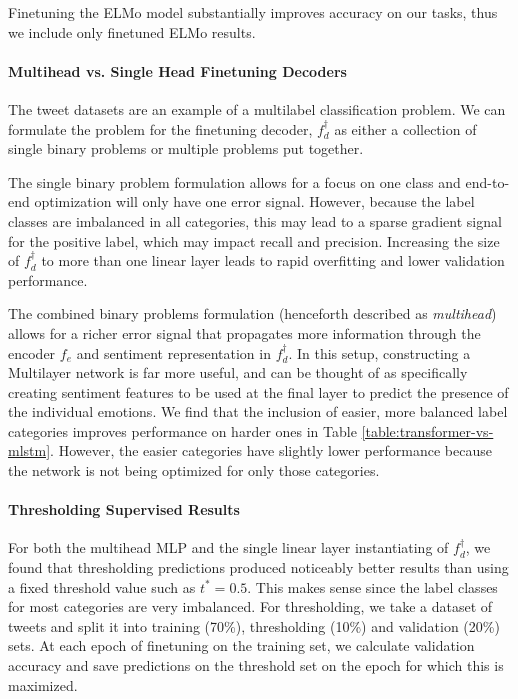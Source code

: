 \documentclass[letterpaper]{article} %
\begin{document}
Finetuning the ELMo model substantially improves accuracy on our tasks, thus we include only finetuned ELMo results. 

\paragraph{Multihead vs. Single Head Finetuning Decoders}
The tweet datasets are an example of a multilabel classification problem. We can formulate the problem for the finetuning decoder, $f_d^{\dagger}$ as either a collection of single binary problems or multiple problems put together. 

The single binary problem formulation allows for a focus on one class and end-to-end optimization will only have one error signal. However, because the label classes are imbalanced in all categories, this may lead to a sparse gradient signal for the positive label, which may impact recall and precision. Increasing the size of $f_d^{\dagger}$ to more than one linear layer leads to rapid overfitting and lower validation performance.

The combined binary problems formulation (henceforth described as \textit{multihead}) allows for a richer error signal that propagates more information through the encoder $f_e$ and sentiment representation in $f^{\dagger}_d$. In this setup, constructing a Multilayer network is far more useful, and can be thought of as specifically creating sentiment features to be used at the final layer to predict the presence of the individual emotions. We find that the inclusion of easier, more balanced label categories improves performance on harder ones in Table \ref{table:transformer-vs-mlstm}. However, the easier categories have slightly lower performance because the network is not being optimized for only those categories. 

\paragraph{Thresholding Supervised Results}
For both the multihead MLP and the single linear layer instantiating of $f_d^{\dagger}$, we found that thresholding predictions produced noticeably better results than using a fixed threshold value such as $t^* = 0.5$. This makes sense since the label classes for most categories are very imbalanced. For thresholding, we take a dataset of tweets and split it into training (70\%), thresholding (10\%) and validation (20\%) sets. At each epoch of finetuning on the training set, we calculate validation accuracy and save predictions on the threshold set on the epoch for which this is maximized. 
\end{document}
